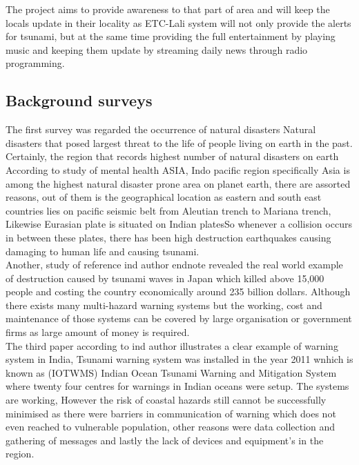 The project aims to provide awareness to that part of area and will keep the locals update in their locality as ETC-Lali system will not only provide the alerts for tsunami, but at the same time providing the full entertainment by playing music and keeping them update by streaming daily news through radio programming.



\subsection{ Background surveys}
The first survey was regarded the occurrence of natural disasters Natural disasters that posed largest threat to the life of people living on earth in the past. Certainly, the region that records highest number of natural disasters on earth\\
 According to study of mental health ASIA, Indo pacific region specifically Asia is among the highest natural disaster prone area on planet earth, there are assorted reasons, out of them is the geographical location as eastern and south east countries lies   on pacific seismic belt  from Aleutian trench to Mariana trench, Likewise Eurasian plate is situated on Indian platesSo whenever a collision occurs in between these plates, there has been high destruction earthquakes causing damaging to human life and causing tsunami. \\

Another, study of reference ind author endnote revealed the real world example of destruction caused by tsunami waves in Japan which killed above 15,000 people and costing the country economically around 235 billion dollars. Although there exists many multi-hazard warning systems but the working, cost and maintenance of those systems can be covered by large organisation or government firms as large amount of money is required.\\

The third paper according to ind author  illustrates a clear example of warning system in India, Tsunami warning system was installed in the year 2011 wnhich is known as (IOTWMS) Indian Ocean Tsunami Warning and Mitigation System where twenty four centres for warnings in Indian oceans were setup. The systems are working, However the risk of coastal hazards still cannot be successfully minimised as there were barriers in communication of warning which does not even reached to vulnerable population, other reasons were data collection and gathering of messages and lastly the lack of devices and equipment’s in the region.  

